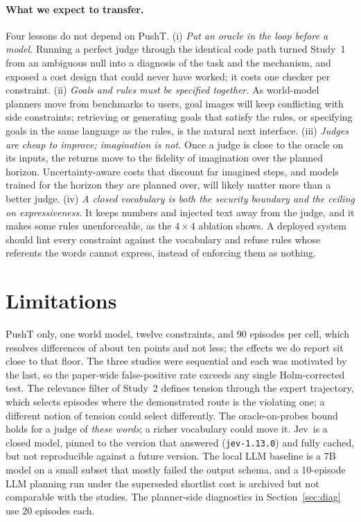 \documentclass[11pt]{article}
\newcommand{\jev}{Jev}
\begin{document}
\paragraph{What we expect to transfer.} Four lessons do not depend on PushT. (i) \emph{Put an oracle in the loop before a model.} Running a perfect judge through the identical code path turned Study~1 from an ambiguous null into a diagnosis of the task and the mechanism, and exposed a cost design that could never have worked; it costs one checker per constraint. (ii) \emph{Goals and rules must be specified together.} As world-model planners move from benchmarks to users, goal images will keep conflicting with side constraints; retrieving or generating goals that satisfy the rules, or specifying goals in the same language as the rules, is the natural next interface. (iii) \emph{Judges are cheap to improve; imagination is not.} Once a judge is close to the oracle on its inputs, the returns move to the fidelity of imagination over the planned horizon. Uncertainty-aware costs that discount far imagined steps, and models trained for the horizon they are planned over, will likely matter more than a better judge. (iv) \emph{A closed vocabulary is both the security boundary and the ceiling on expressiveness.} It keeps numbers and injected text away from the judge, and it makes some rules unenforceable, as the $4\times4$ ablation shows. A deployed system should lint every constraint against the vocabulary and refuse rules whose referents the words cannot express, instead of enforcing them as nothing.

\section{Limitations}
PushT only, one world model, twelve constraints, and 90 episodes per cell, which resolves differences of about ten points and not less; the effects we do report sit close to that floor. The three studies were sequential and each was motivated by the last, so the paper-wide false-positive rate exceeds any single Holm-corrected test. The relevance filter of Study~2 defines tension through the expert trajectory, which selects episodes where the demonstrated route is the violating one; a different notion of tension could select differently. The oracle-on-probes bound holds for a judge of \emph{these words}; a richer vocabulary could move it. \jev\ is a closed model, pinned to the version that answered (\texttt{jev-1.13.0}) and fully cached, but not reproducible against a future version. The local LLM baseline is a 7B model on a small subset that mostly failed the output schema, and a 10-episode LLM planning run under the superseded shortlist cost is archived but not comparable with the studies. The planner-side diagnostics in Section~\ref{sec:diag} use 20 episodes each.
\end{document}
